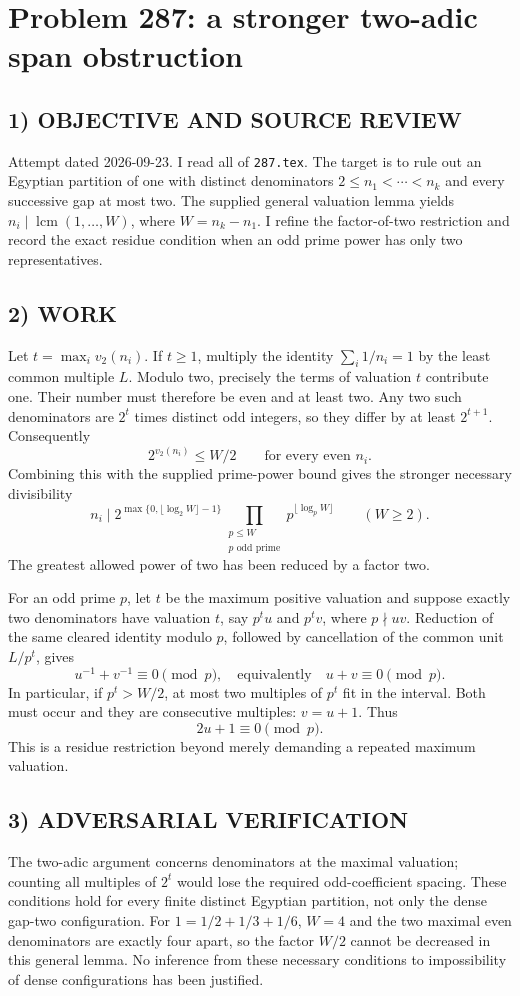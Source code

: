 \section{Problem 287: a stronger two-adic span obstruction}
\subsection*{1) OBJECTIVE AND SOURCE REVIEW}
Attempt dated 2026-09-23. I read all of \texttt{287.tex}. The target is to rule out an Egyptian partition of one with distinct denominators $2\le n_1<\cdots<n_k$ and every successive gap at most two. The supplied general valuation lemma yields $n_i\mid\operatorname{lcm}(1,\ldots,W)$, where $W=n_k-n_1$. I refine the factor-of-two restriction and record the exact residue condition when an odd prime power has only two representatives.
\subsection*{2) WORK}
Let $t=\max_i v_2(n_i)$. If $t\ge1$, multiply the identity $\sum_i1/n_i=1$ by the least common multiple $L$. Modulo two, precisely the terms of valuation $t$ contribute one. Their number must therefore be even and at least two. Any two such denominators are $2^t$ times distinct odd integers, so they differ by at least $2^{t+1}$. Consequently
\[
2^{v_2(n_i)}\le W/2\qquad\text{for every even }n_i.
\]
Combining this with the supplied prime-power bound gives the stronger necessary divisibility
\[
n_i\mid 2^{\max\{0,\lfloor\log_2W\rfloor-1\}}
\prod_{\substack{p\le W\\p\text{ odd prime}}}p^{\lfloor\log_pW\rfloor}
\qquad(W\ge2).
\]
The greatest allowed power of two has been reduced by a factor two.

For an odd prime $p$, let $t$ be the maximum positive valuation and suppose exactly two denominators have valuation $t$, say $p^tu$ and $p^tv$, where $p\nmid uv$. Reduction of the same cleared identity modulo $p$, followed by cancellation of the common unit $L/p^t$, gives
\[
u^{-1}+v^{-1}\equiv0\pmod p,
\quad\text{equivalently}\quad u+v\equiv0\pmod p.
\]
In particular, if $p^t>W/2$, at most two multiples of $p^t$ fit in the interval. Both must occur and they are consecutive multiples: $v=u+1$. Thus
\[
2u+1\equiv0\pmod p.
\]
This is a residue restriction beyond merely demanding a repeated maximum valuation.
\subsection*{3) ADVERSARIAL VERIFICATION}
The two-adic argument concerns denominators at the maximal valuation; counting all multiples of $2^t$ would lose the required odd-coefficient spacing. These conditions hold for every finite distinct Egyptian partition, not only the dense gap-two configuration. For $1=1/2+1/3+1/6$, $W=4$ and the two maximal even denominators are exactly four apart, so the factor $W/2$ cannot be decreased in this general lemma. No inference from these necessary conditions to impossibility of dense configurations has been justified.
